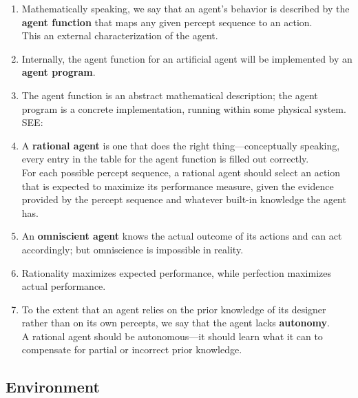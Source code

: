 \begin{enumerate}
    \item Mathematically speaking, we say that an agent’s behavior is described by the \textbf{agent function} that maps any given percept sequence to an action.\\
    This an external characterization of the agent.

    \item Internally, the agent function for an artificial agent will be implemented by an \textbf{agent program}.

    \item[] The agent function is an abstract mathematical description; the agent program is a concrete implementation, running within some physical system.\\
    SEE: 

    \item A \textbf{rational agent} is one that does the right thing—conceptually speaking, every entry in the table for the agent function is filled out correctly. \\
    For each possible percept sequence, a rational agent should select an action that is expected to maximize its performance measure, given the evidence provided by the percept sequence and whatever built-in knowledge the agent has.

    \item An \textbf{omniscient agent} knows the actual outcome of its actions and can act accordingly; but omniscience is impossible in reality. 

    \item Rationality maximizes expected performance, while perfection maximizes actual performance.

    \item To the extent that an agent relies on the prior knowledge of its designer rather than on its own percepts, we say that the agent lacks \textbf{autonomy}.\\
    A rational agent should be autonomous—it should learn what it can to compensate for partial or incorrect prior knowledge. 
\end{enumerate}


\subsection{Environment}

